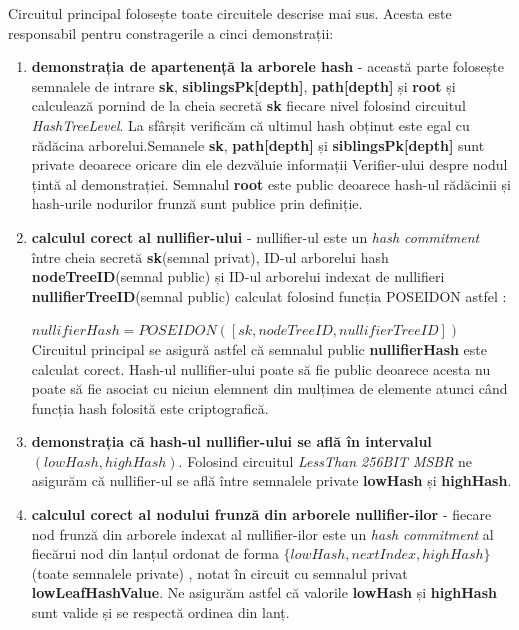 \documentclass[12pt, letterpaper]{article}
\begin{document}
Circuitul principal folosește toate circuitele descrise mai sus. Acesta este responsabil pentru constragerile a cinci demonstrații:
\begin{enumerate}
    \item{\textbf{demonstrația de apartenență la arborele hash} - această parte folosește semnalele de intrare \textbf{sk}, \textbf{siblingsPk[depth]}, \textbf{ path[depth]} și \textbf{root}   și calculează pornind de la cheia secretă \textbf{sk} fiecare nivel folosind circuitul \emph{HashTreeLevel}. La sfârșit verificăm că ultimul hash obținut este egal cu rădăcina arborelui.Semanele \textbf{sk}, \textbf{path[depth]} și \textbf{siblingsPk[depth]} sunt private deoarece oricare din ele dezvăluie informații Verifier-ului despre nodul țintă al demonstrației. Semnalul \textbf{root} este public deoarece hash-ul rădăcinii și hash-urile nodurilor frunză sunt publice prin definiție.}
    
    \item{\textbf{calculul corect al nullifier-ului} - nullifier-ul este un \emph{hash commitment} între cheia secretă \textbf{sk}(semnal privat), ID-ul arborelui hash \textbf{nodeTreeID}(semnal public) și ID-ul arborelui indexat de nullifieri \textbf{nullifierTreeID}(semnal public) calculat folosind funcția POSEIDON astfel :
    
    $nullifierHash=POSEIDON([sk,nodeTreeID,nullifierTreeID])$
    Circuitul principal se asigură astfel că semnalul public \textbf{nullifierHash} este calculat corect. Hash-ul nullifier-ului poate să fie public deoarece acesta nu poate să fie asociat cu niciun elemnent din mulțimea de elemente atunci când funcția hash folosită este criptografică.}
    
    \item{\textbf{demonstrația că hash-ul nullifier-ului se află în intervalul $(lowHash,highHash)$}. Folosind circuitul \emph{LessThan 256BIT MSBR} ne asigurăm că nullifier-ul se află între semnalele private \textbf{lowHash} și \textbf{highHash}.}
\pagebreak
    \item{\textbf{calculul corect al nodului frunză din arborele nullifier-ilor} - fiecare nod frunză din arborele indexat al nullifier-ilor este un \emph{hash commitment} al fiecărui nod din lanțul ordonat de forma $\{lowHash,nextIndex,highHash\}$(toate semnalele private) , notat în circuit cu semnalul privat \textbf{lowLeafHashValue}. Ne asigurăm astfel că valorile \textbf{lowHash} și \textbf{highHash} sunt valide și se respectă ordinea din lanț.}


\end{enumerate}
\end{document}
